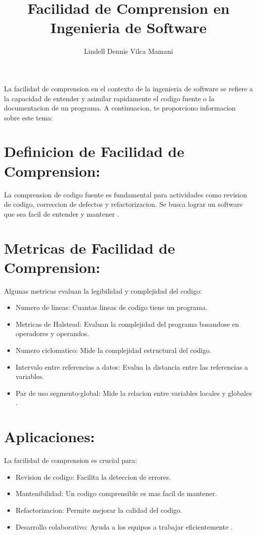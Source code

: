 \documentclass{article}
\title{Facilidad de Comprension en Ingenieria de Software}
\author{Lindell Dennis Vilca Mamani}
\date{} %
\begin{document}
\maketitle

La facilidad de comprension en el contexto de la ingenieria de software se refiere a la capacidad de entender y asimilar rapidamente el codigo fuente o la documentacion de un programa. A continuacion, te proporciono informacion sobre este tema:

\section*{Definicion de Facilidad de Comprension:}
La comprension de codigo fuente es fundamental para actividades como revision de codigo, correccion de defectos y refactorizacion. Se busca lograr un software que sea facil de entender y mantener \cite{tesis_unal}.

\section*{Metricas de Facilidad de Comprension:}
Algunas metricas evaluan la legibilidad y complejidad del codigo:
\begin{itemize}
  \item Numero de lineas: Cuantas lineas de codigo tiene un programa.
  \item Metricas de Halstead: Evaluan la complejidad del programa basandose en operadores y operandos.
  \item Numero ciclomatico: Mide la complejidad estructural del codigo.
  \item Intervalo entre referencias a datos: Evalua la distancia entre las referencias a variables.
  \item Par de uso segmento-global: Mide la relacion entre variables locales y globales \cite{libro_metrics}.
\end{itemize}

\section*{Aplicaciones:}
La facilidad de comprension es crucial para:
\begin{itemize}
  \item Revision de codigo: Facilita la deteccion de errores.
  \item Mantenibilidad: Un codigo comprensible es mas facil de mantener.
  \item Refactorizacion: Permite mejorar la calidad del codigo.
  \item Desarrollo colaborativo: Ayuda a los equipos a trabajar eficientemente \cite{tesis_espoch}.
\end{itemize}
\end{document}
